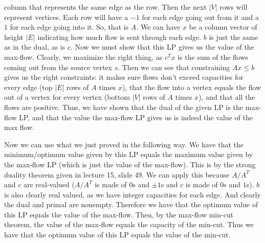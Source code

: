 \documentclass{article}
\begin{document}
\begin{description}
        column that represents the same edge as the row. Then the next $|V|$
        rows will represent vertices. Each row will have a $-1$ for each edge
        going out from it and a $1$ for each edge going into it. So, that is
        $A$. We can have $x$ be a column vector of height $|E|$ indicating how
        much flow is sent through each edge. $b$ is just the same as in the
        dual, as is $c$. Now we must show that this LP gives us the value of the
        max-flow. Clearly, we maximize the right thing, as $c^T x$ is the sum of
        the flows coming out from the source vertex $s$. Then we can see that
        constraining $Ax \leq b$ gives us the right constraints: it makes sure
        flows don't exceed capacities for every edge (top $|E|$ rows of $A$
        times $x$), that the flow into a vertex equals
        the flow out of a vertex for every vertex (bottom $|V|$ rows of $A$ times
        $x$), and that all the flows are positive. Thus,
        we have shown that the dual of the given LP is the max-flow LP, and that
        the value the max-flow LP gives us is indeed the value of the max flow.

        Now we can use what we just proved in the following way. We have that
        the minimum/optimum value given by this LP equals the maximum value
        given by the max-flow LP (which is just the value of the max-flow).
        This is by the strong duality theorem given in lecture 15, slide 49. We can apply
        this because $A/A^T$ and $c$ are
        real-valued ($A/A^T$ is made of $0$s and $\pm1$s and $c$ is made of
        $0$s and $1$s). $b$ is also clearly real valued, as we have integer
        capacities for each edge. And clearly the dual and primal are nonempty.
        Therefore we have that the optimum value of this LP equals the value of the max-flow.
        Then, by the max-flow min-cut theorem, the value of the max-flow equals the
        capacity of the min-cut. Thus we have that the optimum value of this LP equals
        the value of the min-cut.
\end{description}
\newpage

\end{document}

